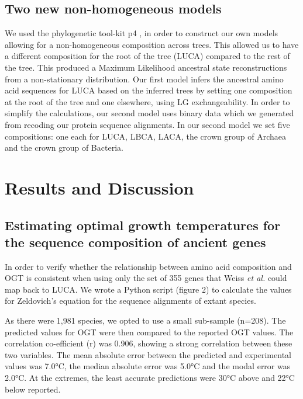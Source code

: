 
\subsection{Two new non-homogeneous models}
We used the phylogenetic tool-kit p4 \cite{foster2004modeling}, in order to construct our own models allowing for a non-homogeneous composition across trees. This allowed us to have a different composition for the root of the tree (LUCA) compared to the rest of the tree. This produced a Maximum Likelihood ancestral state reconstructions from a non-stationary distribution. Our first model infers the ancestral amino acid sequences for LUCA based on the inferred trees by setting one composition at the root of the tree and one elsewhere, using LG exchangeability.
In order to simplify the calculations, our second model uses binary data which we generated from recoding our protein sequence alignments. In our second model we set five compositions: one each for LUCA, LBCA, LACA, the \gls{crown group} of Archaea and the crown group of Bacteria.


\section{Results and Discussion}

\subsection{Estimating optimal growth temperatures for the sequence composition of ancient genes}

In order to verify whether the relationship between amino acid composition and OGT is consistent when using only the set of 355 genes that Weiss \textit{et al.} \cite{weiss2016} could map back to LUCA.  We wrote a Python script (figure 2) \cite{chapman2000biopython} to calculate the values for Zeldovich's equation \cite{zeldovich2007} for the sequence alignments of extant species.

As there were 1,981 species, we opted to use a small sub-sample (n=208). The predicted values for OGT were then compared to the reported OGT values. The correlation co-efficient (r) was 0.906, showing a strong correlation between these two variables. The mean absolute error between the predicted and experimental values was 7.0°C, the median absolute error was 5.0°C and the modal error was 2.0°C. At the extremes, the least accurate predictions were 30°C above and 22°C below reported. 

